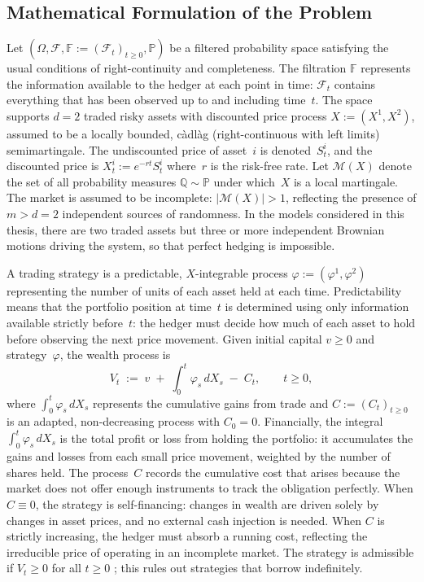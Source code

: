 \subsection{Mathematical Formulation of the Problem}
\label{subsec:math_formulation}

Let $(\Omega, \mathcal{F},
\mathbb{F} := (\mathcal{F}_t)_{t \ge 0}, \mathbb{P})$ be a filtered
probability space satisfying the usual conditions of right-continuity and
completeness.  The filtration $\mathbb{F}$ represents the information
available to the hedger at each point in time: $\mathcal{F}_t$ contains
everything that has been observed up to and including time~$t$.  The space
supports $d = 2$ traded risky assets with discounted price process
$X := (X^1, X^2)$, assumed to be a locally bounded, c\`{a}dl\`{a}g
(right-continuous with left limits) semimartingale.  The undiscounted price
of asset~$i$ is denoted~$S^i_t$, and the discounted price is
$X^i_t := e^{-rt} S^i_t$ where~$r$ is the risk-free rate.  Let
$\mathcal{M}(X)$ denote the set of all probability measures
$\mathbb{Q} \sim \mathbb{P}$ under which~$X$ is a local martingale.  The
market is assumed to be incomplete: $|\mathcal{M}(X)| > 1$, reflecting
the presence of $m > d = 2$ independent sources of randomness.  In the
models considered in this thesis, there are two traded assets but three or
more independent Brownian motions driving the system, so that perfect
hedging is impossible.

A trading strategy is a predictable, $X$-integrable process
$\varphi := (\varphi^1, \varphi^2)$ representing the number of units of
each asset held at each time.  Predictability means that the portfolio
position at time~$t$ is determined using only information available
strictly before~$t$: the hedger must decide how much of each asset to hold
before observing the next price movement.  Given initial capital $v \ge 0$
and strategy~$\varphi$, the wealth process is
\begin{equation}
\label{eq:wealth_process}
V_t
\;:=\; v \;+\; \int_0^t \varphi_s \, dX_s \;-\; C_t,
\qquad t \ge 0,
\end{equation}
where $\int_0^t \varphi_s \, dX_s$ represents the cumulative gains from
trade and $C := (C_t)_{t \ge 0}$ is an adapted, non-decreasing process
with $C_0 = 0$.  Financially, the integral $\int_0^t \varphi_s \, dX_s$
is the total profit or loss from holding the portfolio: it accumulates the
gains and losses from each small price movement, weighted by the number of
shares held.  The process~$C$ records the cumulative cost that arises
because the market does not offer enough instruments to track the
obligation perfectly.  When $C \equiv 0$, the strategy is self-financing:
changes in wealth are driven solely by changes in asset prices, and no
external cash injection is needed.  When $C$ is strictly increasing, the
hedger must absorb a running cost, reflecting the irreducible price of
operating in an incomplete market.  The strategy is admissible if
$V_t \ge 0$ for all $t \ge 0$ \citep{Kramkov1996}; this rules out
strategies that borrow indefinitely.

